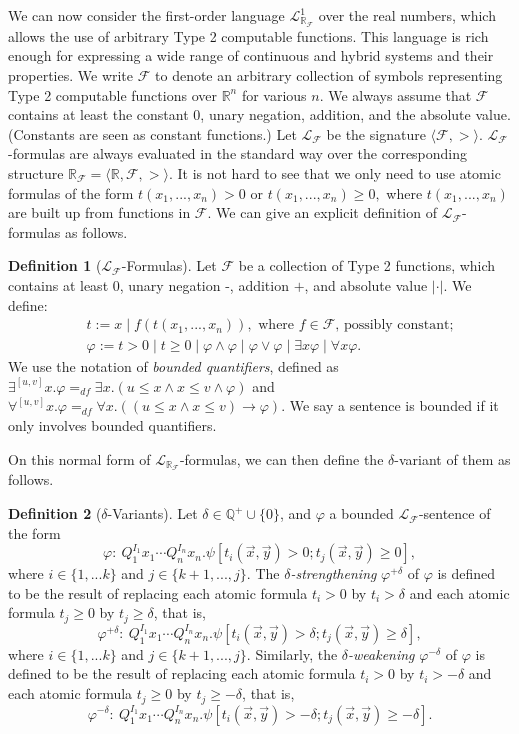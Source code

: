 \documentclass[11pt]{article}
\newcommand{\lrf}{\mathcal{L}_{\mathbb{R}_{\mathcal{F}}}}
\theoremstyle{definition}
\newtheorem{definition}{Definition}[section]
\begin{document}
We can now consider the first-order language $\lrf^1$ over the real numbers, which allows the use of arbitrary Type 2 computable functions. This language is rich enough for expressing a wide range of continuous and hybrid systems and their properties. 
We write $\mathcal{F}$ to denote an arbitrary collection of symbols representing Type 2 computable functions over $\mathbb{R}^n$ for various $n$. We always assume that $\mathcal{F}$ contains at least the constant $0$, unary negation, addition, and the absolute value. (Constants are seen as constant functions.) Let $\mathcal{L_{\mathcal{F}}}$ be the signature $\langle \mathcal{F}, >\rangle$. $\mathcal{L}_{\mathcal{F}}$-formulas are always evaluated in the standard way over the corresponding structure $\mathbb{R}_{\mathcal{F}}= \langle \mathbb{R}, \mathcal{F}, >\rangle$.  It is not hard to see that we only need to use atomic formulas of the form $t(x_1,...,x_n)>0$ or $t(x_1,...,x_n)\geq 0,$ where $t(x_1,...,x_n)$ are built up from functions in $\mathcal{F}$. We can give an explicit definition of $\mathcal{L}_{\mathcal{F}}$-formulas as follows.
\begin{definition}[$\mathcal{L}_{\mathcal{F}}$-Formulas]
Let $\mathcal{F}$ be a collection of Type 2 functions, which contains at least $0$, unary negation -, addition $+$, and absolute value $|\cdot|$. We define:
\begin{eqnarray*}
&&t := x \; | \; f(t(x_1, ..., x_n)), \mbox{ where }f\in \mathcal{F}\mbox{, possibly constant};\\
&&\varphi := t> 0 \; | \; t\geq 0 \; | \; \varphi\wedge\varphi \; | \; \varphi\vee\varphi \; | \; \exists x\varphi \; |\; \forall x\varphi.
\end{eqnarray*}
We use the notation of {\em bounded quantifiers}, defined as $\exists^{[u,v]}x.\varphi =_{df}\exists x. ( u \leq x \land x \leq v \wedge \varphi)$ and $\forall^{[u,v]}x.\varphi =_{df} \forall x. ( (u \leq x \land x \leq v) \rightarrow \varphi)$. We say a sentence is bounded if it only involves bounded quantifiers. 
\end{definition}
On this normal form of $\lrf$-formulas, we can then define the $\delta$-variant of them as follows. 
\begin{definition}[$\delta$-Variants]
Let $\delta\in \mathbb{Q}^+\cup\{0\}$, and $\varphi$ a bounded $\mathcal{L}_{\mathcal{F}}$-sentence of the form
$$\varphi:\ Q_1^{I_1}x_1\cdots Q_n^{I_n}x_n.\psi[t_i(\vec x, \vec y)>0; t_j(\vec x, \vec y)\geq 0],$$
where $i\in\{1,...k\}$ and $j\in\{k+1,...,j\}$. The {\em $\delta$-strengthening} $\varphi^{+\delta}$ of $\varphi$ is defined to be the result of replacing each atomic formula $t_i > 0$ by $t_i > \delta$ and each atomic formula $t_j \geq 0$ by $t_j \geq \delta$, that is,
$$\varphi^{+\delta}:\ Q_1^{I_1}x_1\cdots Q_n^{I_n}x_n.\psi[t_i(\vec x, \vec y)>\delta; t_j(\vec x, \vec y)\geq \delta],$$
where $i\in\{1,...k\}$ and $j\in\{k+1,...,j\}$.
Similarly, the {\em $\delta$-weakening} $\varphi^{-\delta}$ of $\varphi$ is defined to be the result of replacing each atomic formula $t_i > 0$ by $t_i > -\delta$ and each atomic formula $t_j \geq 0$ by $t_j \geq -\delta$, that is,
$$\varphi^{-\delta}:\ Q_1^{I_1}x_1\cdots Q_n^{I_n}x_n.\psi[t_i(\vec x, \vec y)>-\delta; t_j(\vec x, \vec y)\geq -\delta].$$
\end{definition}
\end{document}
